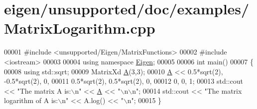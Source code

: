 \hypertarget{eigen_2unsupported_2doc_2examples_2_matrix_logarithm_8cpp_source}{}\section{eigen/unsupported/doc/examples/\+Matrix\+Logarithm.cpp}
\label{eigen_2unsupported_2doc_2examples_2_matrix_logarithm_8cpp_source}

\begin{DoxyCode}
00001 \textcolor{preprocessor}{#include <unsupported/Eigen/MatrixFunctions>}
00002 \textcolor{preprocessor}{#include <iostream>}
00003 
00004 \textcolor{keyword}{using namespace }\hyperlink{namespace_eigen}{Eigen};
00005 
00006 \textcolor{keywordtype}{int} main()
00007 \{
00008   \textcolor{keyword}{using} std::sqrt;
00009   MatrixXd \hyperlink{group___core___module_class_eigen_1_1_matrix}{A}(3,3);
00010   \hyperlink{group___core___module_class_eigen_1_1_matrix}{A} << 0.5*sqrt(2), -0.5*sqrt(2), 0,
00011        0.5*sqrt(2),  0.5*sqrt(2), 0,
00012        0,            0,           1;
00013   std::cout << \textcolor{stringliteral}{"The matrix A is:\(\backslash\)n"} << \hyperlink{group___core___module_class_eigen_1_1_matrix}{A} << \textcolor{stringliteral}{"\(\backslash\)n\(\backslash\)n"};
00014   std::cout << \textcolor{stringliteral}{"The matrix logarithm of A is:\(\backslash\)n"} << A.log() << \textcolor{stringliteral}{"\(\backslash\)n"};
00015 \}
\end{DoxyCode}
